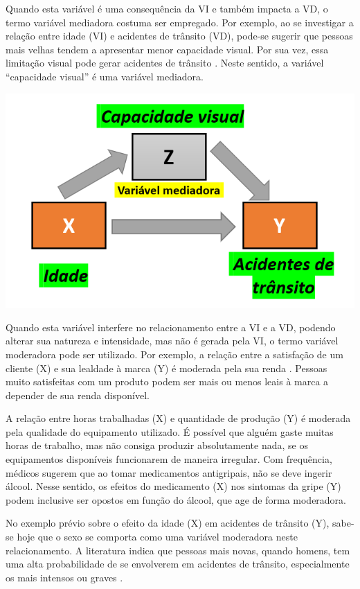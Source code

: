 \documentclass[
]{book}
\begin{document}
Quando esta variável é uma consequência da VI e também impacta a VD, o termo variável mediadora costuma ser empregado. Por exemplo, ao se investigar a relação entre idade (VI) e acidentes de trânsito (VD), pode-se sugerir que pessoas mais velhas tendem a apresentar menor capacidade visual. Por sua vez, essa limitação visual pode gerar acidentes de trânsito \citep{Rhodes2011}. Neste sentido, a variável ``capacidade visual'' é uma variável mediadora.

\includegraphics{./img/cap_mediacao.png}

Quando esta variável interfere no relacionamento entre a VI e a VD, podendo alterar sua natureza e intensidade, mas não é gerada pela VI, o termo variável moderadora pode ser utilizado. Por exemplo, a relação entre a satisfação de um cliente (X) e sua lealdade à marca (Y) é moderada pela sua renda \citep{Sugianto2017}. Pessoas muito satisfeitas com um produto podem ser mais ou menos leais à marca a depender de sua renda disponível.

A relação entre horas trabalhadas (X) e quantidade de produção (Y) é moderada pela qualidade do equipamento utilizado. É possível que alguém gaste muitas horas de trabalho, mas não consiga produzir absolutamente nada, se os equipamentos disponíveis funcionarem de maneira irregular. Com frequência, médicos sugerem que ao tomar medicamentos antigripais, não se deve ingerir álcool. Nesse sentido, os efeitos do medicamento (X) nos sintomas da gripe (Y) podem inclusive ser opostos em função do álcool, que age de forma moderadora.

No exemplo prévio sobre o efeito da idade (X) em acidentes de trânsito (Y), sabe-se hoje que o sexo se comporta como uma variável moderadora neste relacionamento. A literatura indica que pessoas mais novas, quando homens, tem uma alta probabilidade de se envolverem em acidentes de trânsito, especialmente os mais intensos ou graves \citep{Amarasingha2014, PRB2006}.
\end{document}
